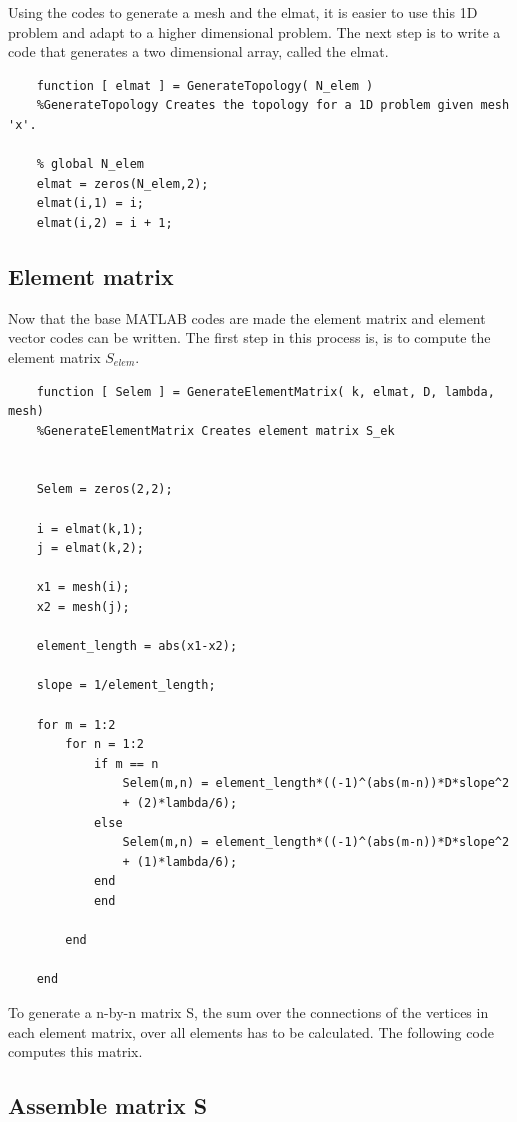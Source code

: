 \documentclass{report}
\begin{document}
Using the codes to generate a mesh and the elmat, it is easier to use this 1D problem and adapt to a higher dimensional problem. The next step is to write a code that generates a two dimensional array, called the elmat.

\begin{lstlisting}
	function [ elmat ] = GenerateTopology( N_elem )
	%GenerateTopology Creates the topology for a 1D problem given mesh 'x'.
	
	% global N_elem
	elmat = zeros(N_elem,2);
	elmat(i,1) = i;
	elmat(i,2) = i + 1;

\end{lstlisting}

\subsection{Element matrix}

Now that the base MATLAB codes are made the element matrix and element vector codes can be written. The first step in this process is, is to compute the element matrix $S_{elem}$.

\begin{lstlisting}
	function [ Selem ] = GenerateElementMatrix( k, elmat, D, lambda, mesh)
	%GenerateElementMatrix Creates element matrix S_ek
	
	
	Selem = zeros(2,2);
	
	i = elmat(k,1);
	j = elmat(k,2);
	
	x1 = mesh(i);
	x2 = mesh(j);
	
	element_length = abs(x1-x2);
	
	slope = 1/element_length; 
	
	for m = 1:2
		for n = 1:2
			if m == n
				Selem(m,n) = element_length*((-1)^(abs(m-n))*D*slope^2
				+ (2)*lambda/6);
			else
				Selem(m,n) = element_length*((-1)^(abs(m-n))*D*slope^2
				+ (1)*lambda/6);
			end
			end
	
		end
	
	end
\end{lstlisting}

\bigskip

To generate a n-by-n matrix S, the sum over the connections of the vertices in each element matrix, over all elements has to be calculated. The following code computes this matrix.


\subsection{Assemble matrix S}
\end{document}
